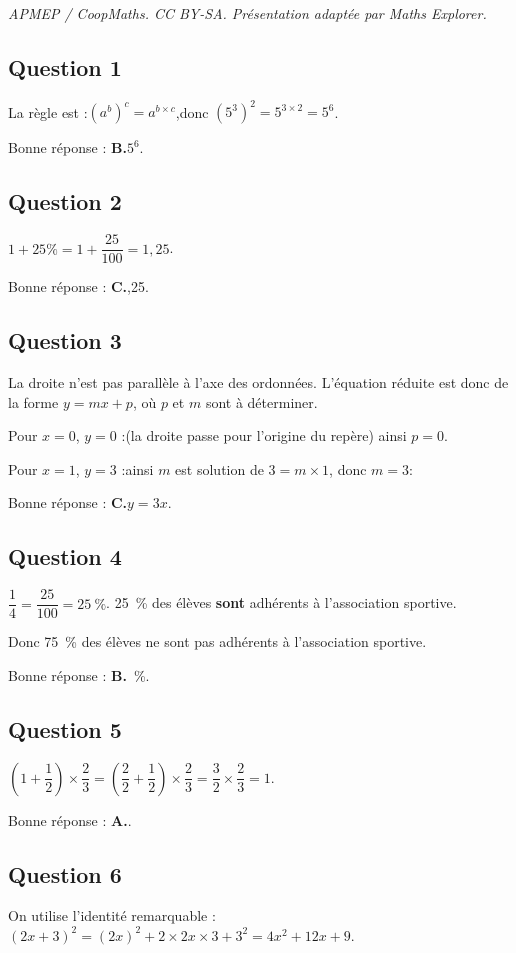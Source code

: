 \documentclass[10pt]{article}
\begin{document}
\noindent\textit{APMEP / CoopMaths. CC BY-SA. Présentation adaptée par Maths Explorer.}\par\medskip
\subsection*{Question 1}
	La règle est :\quad $\left(a^b\right)^c = a^{b \times c}$,\quad donc \quad $\left(5^{3}\right)^{2}=  5^{3\times 2} = 5^6$.

	Bonne réponse : \textbf{B.}\quad $5^6$.

\subsection*{Question 2}
	$ 1 + 25\% = 1+\dfrac{25}{100} = 1,25$.

	Bonne réponse : \textbf{C.},25.

\subsection*{Question 3}
	La droite n'est pas parallèle à l'axe des ordonnées. L'équation réduite est donc de la forme $y=mx+p$, où $p$ et $m$ sont à déterminer.

	Pour $x=0$, $y=0$ :\quad (la droite passe pour l'origine du repère) ainsi $p=0$.

	Pour $x=1$, $y=3$ :\quad ainsi $m$ est solution de $3 = m\times 1$, donc $m=3$:

	Bonne réponse : \textbf{C.}\quad $y=3x$.

\subsection*{Question 4}
	$\dfrac{1}{4} = \dfrac{25}{100} = 25~\%$. 25~\% des élèves \textbf{sont} adhérents à l'association sportive.

	Donc 75~\% des élèves ne sont pas adhérents à l'association sportive.

	Bonne réponse : \textbf{B.}~\%.

\subsection*{Question 5}
	$\left(1+\dfrac{1}{2}\right)\times\dfrac{2}{3} = \left(\dfrac{2}{2}+\dfrac{1}{2}\right)\times\dfrac{2}{3} = \dfrac{3}{2}\times \dfrac{2}{3} = 1 $.

	Bonne réponse : \textbf{A.}.

\subsection*{Question 6}
	On utilise l'identité remarquable :\quad $(2x+3)^2 = (2x)^2+2\times 2x \times 3 + 3^2 = 4x^2 + 12x + 9$.
\end{document}
